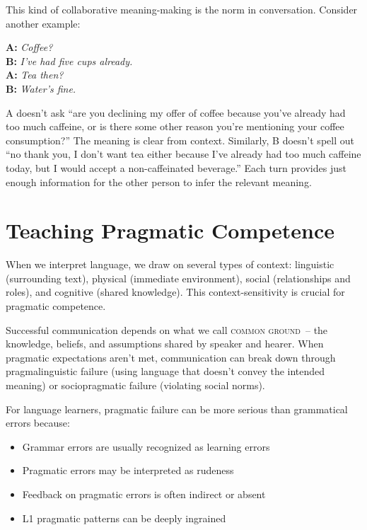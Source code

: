 This kind of collaborative meaning-making is the norm in conversation. Consider another example:

\ea
   \textbf{A:} \textit{Coffee?}\\
   \textbf{B:} \textit{I've had five cups already.}\\
   \textbf{A:} \textit{Tea then?}\\
   \textbf{B:} \textit{Water's fine.}
\z

A doesn't ask ``are you declining my offer of coffee because you've already had too much caffeine, or is there some other reason you're mentioning your coffee consumption?'' The meaning is clear from context. Similarly, B doesn't spell out ``no thank you, I don't want tea either because I've already had too much caffeine today, but I would accept a non-caffeinated beverage.'' Each turn provides just enough information for the other person to infer the relevant meaning.

\section{Teaching Pragmatic Competence}

When we interpret language, we draw on several types of context: linguistic (surrounding text), physical (immediate environment), social (relationships and roles), and cognitive (shared knowledge). This context-sensitivity is crucial for pragmatic competence.

Successful communication depends on what we call \textsc{common ground}~-- the knowledge, beliefs, and assumptions shared by speaker and hearer. When pragmatic expectations aren't met, communication can break down through pragmalinguistic failure (using language that doesn't convey the intended meaning) or sociopragmatic failure (violating social norms).

For language learners, pragmatic failure can be more serious than grammatical errors because:
\begin{itemize}[noitemsep]
    \item Grammar errors are usually recognized as learning errors
    \item Pragmatic errors may be interpreted as rudeness
    \item Feedback on pragmatic errors is often indirect or absent
    \item L1 pragmatic patterns can be deeply ingrained
\end{itemize}


